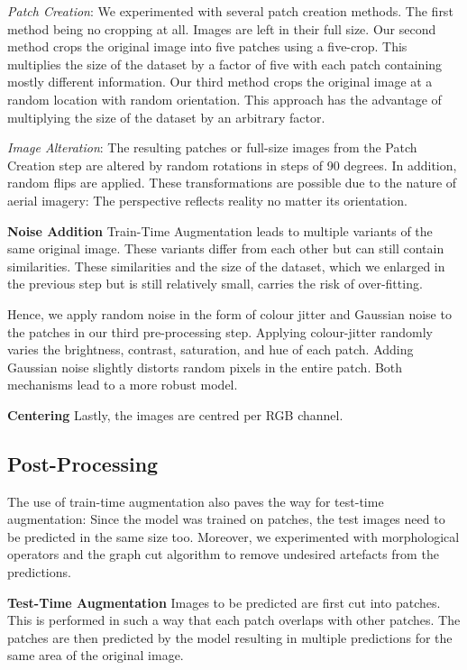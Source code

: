\documentclass[10pt,conference,compsocconf]{IEEEtran}
\begin{document}
\textit{Patch Creation}: We experimented with several patch creation methods. The first method being no cropping at all. Images are left in their full size. Our second method crops the original image into five patches using a five-crop. This multiplies the size of the dataset by a factor of five with each patch containing mostly different information. Our third method crops the original image at a random location with random orientation. This approach has the advantage of multiplying the size of the dataset by an arbitrary factor.

\textit{Image Alteration}: The resulting patches or full-size images from the Patch Creation step are altered by random rotations in steps of 90 degrees. In addition, random flips are applied. These transformations are possible due to the nature of aerial imagery: The perspective reflects reality no matter its orientation.

\textbf{Noise Addition}
Train-Time Augmentation leads to multiple variants of the same original image. These variants differ from each other but can still contain similarities. These similarities and the size of the dataset, which we enlarged in the previous step but is still relatively small, carries the risk of over-fitting.

Hence, we apply random noise in the form of colour jitter and Gaussian noise to the patches in our third pre-processing step. Applying colour-jitter randomly varies the brightness, contrast, saturation, and hue of each patch. Adding Gaussian noise slightly distorts random pixels in the entire patch. Both mechanisms lead to a more robust model.

\textbf{Centering}
Lastly, the images are centred per RGB channel.


\subsection{Post-Processing}

The use of train-time augmentation also paves the way for test-time augmentation: Since the model was trained on patches, the test images need to be predicted in the same size too. Moreover, we experimented with morphological operators and the graph cut algorithm to remove undesired artefacts from the predictions.

\textbf{Test-Time Augmentation}
Images to be predicted are first cut into patches. This is performed in such a way that each patch overlaps with other patches. The patches are then predicted by the model resulting in multiple predictions for the same area of the original image.
\end{document}
